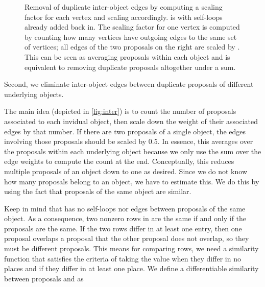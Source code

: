 \documentclass[letterpaper]{article}
\begin{document}
\begin{figure}
    \centering
    \caption{
        Removal of duplicate inter-object edges by computing a scaling factor for each vertex and scaling  accordingly.
         is  with self-loops already added back in.
        The scaling factor for one vertex is computed by counting how many vertices have outgoing edges to the same set of vertices; all edges of the two proposals on the right are scaled by .
        This can be seen as averaging proposals within each object and is equivalent to removing duplicate proposals altogether under a sum.
    }
    \label{fig:inter}
\end{figure}

Second, we eliminate inter-object edges between duplicate proposals of different underlying objects.

The main idea (depicted in \autoref{fig:inter}) is to count the number of proposals associated to each invidual object, then scale down the weight of their associated edges by that number.
If there are two proposals of a single object, the edges involving those proposals should be scaled by 0.5.
In essence, this averages over the proposals within each underlying object because we only use the sum over the edge weights to compute the count at the end.
Conceptually, this reduces multiple proposals of an object down to one as desired.
Since we do not know how many proposals belong to an object, we have to estimate this.
We do this by using the fact that proposals of the same object are similar.

Keep in mind that  has no self-loops nor edges between proposals of the same object.
As a consequence, two nonzero rows in  are the same if and only if the proposals are the same.
If the two rows differ in at least one entry, then one proposal overlaps a proposal that the other proposal does not overlap, so they must be different proposals.
This means for comparing rows, we need a similarity function that satisfies the criteria of taking the value  when they differ in no places and  if they differ in at least one place.
We define a differentiable similarity between proposals  and  as
\end{document}
